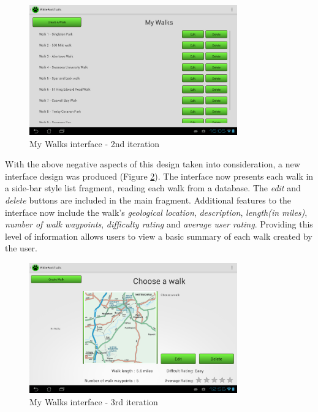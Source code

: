 \documentclass[11pt,a4paper]{report}
\begin{document}
\begin{figure}[H]
    \centering
    \includegraphics[width=0.8\textwidth]{chris/app_my_walks_view}
    \caption{My Walks interface - 2nd iteration}
    \label{fig:app_my_walks_view1}
\end{figure}

With the above negative aspects of this design taken into consideration, a new interface design was produced (Figure \ref{fig:app_my walks_view2}). The interface now presents each walk in a side-bar style list fragment, reading each walk from a database. The \emph{edit} and \emph{delete} buttons are included in the main fragment. Additional features to the interface now include the walk's \emph{geological location}, \emph{description}, \emph{length(in miles)}, \emph{number of walk waypoints}, \emph{difficulty rating} and \emph{average user rating}. Providing this level of information allows users to view a basic summary of each walk created by the user.

\begin{figure}[H]
    \centering
    \includegraphics[width=0.8\textwidth]{chris/final_walk_view}
    \caption{My Walks interface - 3rd iteration}
    \label{fig:app_my walks_view2}
\end{figure}
\end{document}
